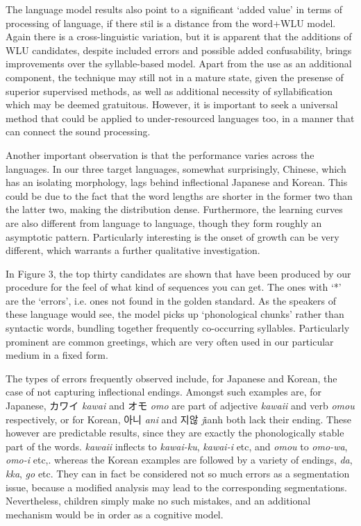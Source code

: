 \documentclass[a4]{article}
\newcommand\korean{\CJKfamily{korm}\CJKspace}
\begin{document}
The language model results also point to a significant  `added value' in terms of processing of language, if there stil is a distance from the word+WLU model. Again there is a cross-linguistic variation, but it is apparent that the additions of WLU candidates, despite included errors and possible added confusability, brings improvements over the syllable-based model. Apart from the use as an additional component, the technique may still not in a mature state, given the presense of superior supervised methods, as well as additional necessity of syllabification which may be deemed gratuitous. However, it is important to seek a universal method that could be applied to under-resourced languages too, in a manner that can connect the sound processing.

Another important observation is that the performance varies across the languages. In our three target languages, somewhat surprisingly, Chinese, which has an isolating morphology, lags behind inflectional Japanese and Korean. This could be due to the fact that the word lengths are shorter in the former two than the latter two, making the distribution dense. Furthermore, the learning curves are also different from language to language, though they form roughly an asymptotic pattern. Particularly interesting is the onset of growth can be very different, which warrants a further qualitative investigation.


In Figure 3, the top thirty candidates are shown that have been produced by our procedure for the feel of what kind of sequences you can get. The ones with `*' are the `errors', i.e. ones not found in the golden standard. As the speakers of these language would see, the model picks up `phonological chunks' rather than syntactic words, bundling together frequently co-occurring syllables. Particularly prominent are common greetings, which are very often used in our particular medium in a fixed form.

 The types of errors frequently observed include, for Japanese and Korean, the case of not capturing inflectional endings. Amongst such examples are, for Japanese, カワイ \emph{kawai} and オモ \emph{omo} are part of adjective \emph{kawaii} and verb \emph{omou} respectively, or for Korean, {\korean 아니} \emph{ani} and {\korean 지않} {\emph jianh} both lack their ending. These however are predictable results, since they are exactly the phonologically stable part of the words. \emph{kawaii} inflects to \emph{kawai-ku}, \emph{kawai-i} etc, and \emph{omou} to \emph{omo-wa}, \emph{omo-i} etc,. whereas the Korean examples are followed by a variety of endings, \emph{da}, \emph{kka}, \emph{go} etc. They can in fact be considered not so much errors as a segmentation issue, because a modified analysis may lead to the corresponding segmentations. Nevertheless, children simply make no such mistakes, and an additional mechanism would be in order as a cognitive model.
\end{document}
